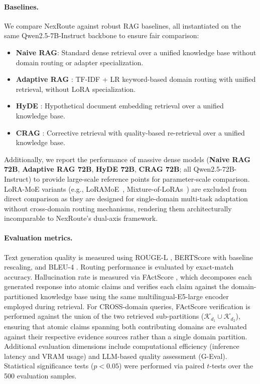 \documentclass[a4paper,fleql]{cas-sc}
\begin{document}
\paragraph{Baselines.}
We compare NexRoute against robust RAG baselines, all instantiated on the same
Qwen2.5-7B-Instruct backbone to ensure fair comparison:
\begin{itemize}
    \item \textbf{Naive RAG}: Standard dense retrieval over a unified knowledge
    base without domain routing or adapter specialization.

    \item \textbf{Adaptive RAG} \citep{jeong2024adaptiverag}: TF-IDF + LR
    keyword-based domain routing with unified retrieval, without LoRA
    specialization.

    \item \textbf{HyDE} \citep{gao2023hyde}: Hypothetical document embedding
    retrieval over a unified knowledge base.

    \item \textbf{CRAG} \citep{yan2024crag}: Corrective retrieval with
    quality-based re-retrieval over a unified knowledge base.
\end{itemize}
Additionally, we report the performance of massive dense models
(\textbf{Naive RAG 72B}, \textbf{Adaptive RAG 72B}, \textbf{HyDE 72B},
\textbf{CRAG 72B}; all Qwen2.5-72B-Instruct) to provide large-scale
reference points for parameter-scale comparison. LoRA-MoE variants
(e.g., LoRAMoE~\citep{dou2024loramoe}, Mixture-of-LoRAs~\citep{wu2024mixtureofloras})
are excluded from direct comparison as they are designed for
single-domain multi-task adaptation without cross-domain routing mechanisms,
rendering them architecturally incomparable to NexRoute's dual-axis framework.

\paragraph{Evaluation metrics.}
Text generation quality is measured using ROUGE-L \citep{lin2004rouge},
BERTScore \citep{zhang2020bertscore} with baseline rescaling, and BLEU-4
\citep{papineni2002bleu}. Routing performance is evaluated by exact-match
accuracy. Hallucination rate is measured via FActScore
\citep{min2023factscore}, which decomposes each generated response into atomic
claims and verifies each claim against the domain-partitioned knowledge base
using the same multilingual-E5-large encoder employed during retrieval. For
CROSS-domain queries, FActScore verification is performed against the union of
the two retrieved sub-partitions ($\mathcal{K}_{d_1} \cup \mathcal{K}_{d_2}$),
ensuring that atomic claims spanning both contributing domains are evaluated
against their respective evidence sources rather than a single domain partition.
Additional evaluation dimensions include computational efficiency (inference
latency and VRAM usage) and LLM-based quality assessment (G-Eval). Statistical
significance tests ($p < 0.05$) were performed via paired $t$-tests over the
500 evaluation samples.
\end{document}
